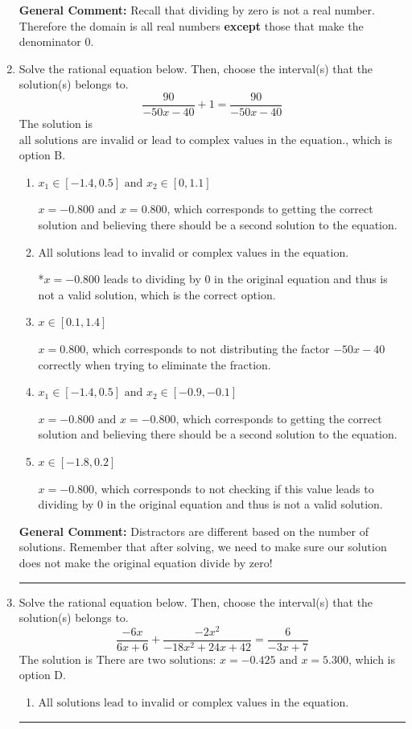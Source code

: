 \documentclass{extbook}[14pt]
\newcommand{\litem}[1]{\item #1

\rule{\textwidth}{0.4pt}}
\begin{document}
\begin{enumerate}
{\textbf{General Comment:} Recall that dividing by zero is not a real number. Therefore the domain is all real numbers \textbf{except} those that make the denominator 0.
}
\litem{
Solve the rational equation below. Then, choose the interval(s) that the solution(s) belongs to.
\[ \frac{90}{-50x -40} + 1 = \frac{90}{-50x -40} \]The solution is \( \text{all solutions are invalid or lead to complex values in the equation.} \), which is option B.\begin{enumerate}[label=\Alph*.]
\item \( x_1 \in [-1.4, 0.5] \text{ and } x_2 \in [0,1.1] \)

$x = -0.800 \text{ and } x = 0.800$, which corresponds to getting the correct solution and believing there should be a second solution to the equation.
\item \( \text{All solutions lead to invalid or complex values in the equation.} \)

*$x = -0.800$ leads to dividing by 0 in the original equation and thus is not a valid solution, which is the correct option.
\item \( x \in [0.1,1.4] \)

$x = 0.800$, which corresponds to not distributing the factor $-50x -40$ correctly when trying to eliminate the fraction.
\item \( x_1 \in [-1.4, 0.5] \text{ and } x_2 \in [-0.9,-0.1] \)

$x = -0.800 \text{ and } x = -0.800$, which corresponds to getting the correct solution and believing there should be a second solution to the equation.
\item \( x \in [-1.8,0.2] \)

$x = -0.800$, which corresponds to not checking if this value leads to dividing by 0 in the original equation and thus is not a valid solution.
\end{enumerate}

\textbf{General Comment:} Distractors are different based on the number of solutions. Remember that after solving, we need to make sure our solution does not make the original equation divide by zero!
}
\litem{
Solve the rational equation below. Then, choose the interval(s) that the solution(s) belongs to.
\[ \frac{-6x}{6x + 6} + \frac{-2x^{2}}{-18x^{2} +24 x + 42} = \frac{6}{-3x + 7} \]The solution is \( \text{There are two solutions: } x = -0.425 \text{ and } x = 5.300 \), which is option D.\begin{enumerate}[label=\Alph*.]
\item \( \text{All solutions lead to invalid or complex values in the equation.} \)



\end{enumerate}}
\end{enumerate}
\end{document}

